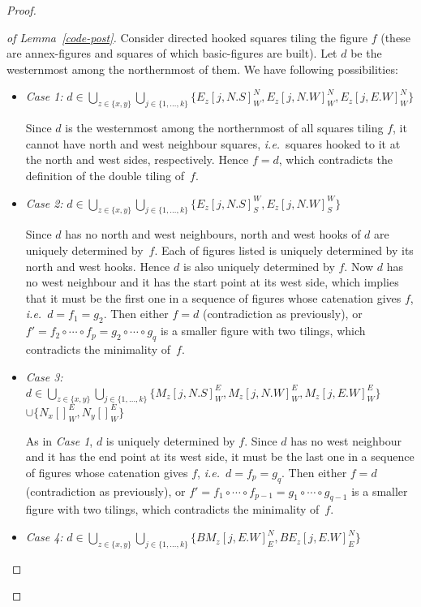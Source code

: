 \documentclass[final,nomarks]{dmtcs-episciences}
\newcommand{\NN}[1]{\{1,\ldots,#1\}}
\begin{document}
\begin{proof}
\begin{proof}[of Lemma~\ref{code-post}]
Consider directed hooked squares tiling the figure $f$ (these are
annex-figures and squares of which basic-figures are built). Let
$d$ be the westernmost among the northernmost of them. We have
following possibilities:
\begin{itemize}

\item\emph{Case 1:}
$d\in\bigcup_{z\in\{x,y\}}\bigcup_{j\in\NN{k}}\{
	E_z[j,N.S]^N_W,
	E_z[j,N.W]^N_W,
	E_z[j,E.W]^N_W
\}$

Since $d$ is the westernmost among the northernmost of all
squares tiling $f$, it cannot have north and west neighbour
squares, \textit{i.e.}\ squares hooked to it at the north and
west sides, respectively. Hence $f=d$, which contradicts the
definition of the double tiling of~$f$.

\item\emph{Case 2:}
$d\in\bigcup_{z\in\{x,y\}}\bigcup_{j\in\NN{k}}\{
	E_z[j,N.S]^W_S,
	E_z[j,N.W]^W_S
\}$

Since $d$ has no north and west neighbours, north and west hooks of
$d$ are uniquely determined by~$f$.
Each of figures listed is uniquely determined by its north and west hooks.
Hence $d$ is also uniquely determined by $f$. Now
$d$ has no west neighbour and it has the start point at its west side,
which implies that it must be the first one in a
sequence of figures whose catenation gives $f$, \textit{i.e.}\
$d=f_1=g_2$. Then either $f=d$ (contradiction as previously), or
$f'=f_2\circ\cdots\circ f_p=g_2\circ\cdots\circ g_q$ is a smaller
figure with two tilings, which contradicts
the minimality of~$f$.

\item\emph{Case 3:}
$d\in\bigcup_{z\in\{x,y\}}\bigcup_{j\in\NN{k}}\{
	M_z[j,N.S]^E_W,
	M_z[j,N.W]^E_W,
	M_z[j,E.W]^E_W
\}$\\ 
\mbox{}\hfill $\cup \{N_x[]^E_W,N_y[]^E_W\}$

As in \emph{Case 1}, $d$ is uniquely determined by $f$. Since
$d$ has no west neighbour and it has the end point at its west
side, it must be the last one in a sequence of figures whose
catenation gives $f$, \textit{i.e.}\ $d=f_p=g_q$. Then either
$f=d$ (contradiction as previously), or $f'=f_1\circ\cdots\circ
f_{p-1}=g_1\circ\cdots\circ g_{q-1}$ is a smaller figure with
two tilings, which contradicts the minimality of~$f$.

\item\emph{Case 4:}
$d\in\bigcup_{z\in\{x,y\}}\bigcup_{j\in\NN{k}}\{
	BM_z[j,E.W]^N_E,
	BE_z[j,E.W]^N_E
\}$


\end{itemize}
\end{proof}
\end{proof}
\end{document}
